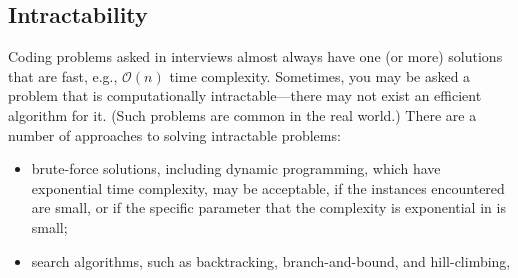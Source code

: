 \documentclass[10pt,openany,twoside,letterpaper,extrafontsizes]{memoir}
\newcommand{\myindex}[1]{%
\index[terms]{#1}%
}
\begin{document}
\begin{Spacing}{\honorsSpacing}

\section*{Intractability}
Coding problems asked in interviews almost always have one (or more)
solutions that are fast, e.g., $\mathcal{O}(n)$ time complexity.
Sometimes, you may be asked a problem that is computationally intractable---there may
not exist an efficient algorithm for it. (Such problems are common
in the real world.)
%
There are a number of approaches to solving intractable problems:
\label{coping-with-intractability}
\begin{itemize}
\item brute-force solutions, including dynamic programming,
which have exponential time complexity, may be acceptable, if the instances encountered are small,
or if the specific parameter that the complexity is exponential in is small;
\item search algorithms, such as backtracking, branch-and-bound, and hill-climbing,

\end{itemize}
\end{Spacing}
\end{document}
